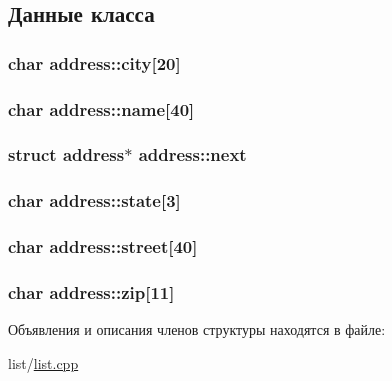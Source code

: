 \subsection{Данные класса}
\hypertarget{structaddress_a4852ddbf08c42594e621cd02e5896aa5}{
\subsubsection[{city}]{\setlength{\rightskip}{0pt plus 5cm}char address\-::city\mbox{[}20\mbox{]}}}\label{structaddress_a4852ddbf08c42594e621cd02e5896aa5}
\hypertarget{structaddress_a2aaf4b88edfd2d1fc111fe66161a0c20}{
\subsubsection[{name}]{\setlength{\rightskip}{0pt plus 5cm}char address\-::name\mbox{[}40\mbox{]}}}\label{structaddress_a2aaf4b88edfd2d1fc111fe66161a0c20}
\hypertarget{structaddress_a7fc6469ede585dbf482921487f2e233c}{
\subsubsection[{next}]{\setlength{\rightskip}{0pt plus 5cm}struct {\bf address}$\ast$ address\-::next}}\label{structaddress_a7fc6469ede585dbf482921487f2e233c}
\hypertarget{structaddress_ac8434820bdc27fbb4fc3ead62b1983ec}{
\subsubsection[{state}]{\setlength{\rightskip}{0pt plus 5cm}char address\-::state\mbox{[}3\mbox{]}}}\label{structaddress_ac8434820bdc27fbb4fc3ead62b1983ec}
\hypertarget{structaddress_a6637fb175db73273b18545c7e862d0e9}{
\subsubsection[{street}]{\setlength{\rightskip}{0pt plus 5cm}char address\-::street\mbox{[}40\mbox{]}}}\label{structaddress_a6637fb175db73273b18545c7e862d0e9}
\hypertarget{structaddress_a4d23b9ff269dec0d61b9398e2a0eb3aa}{
\subsubsection[{zip}]{\setlength{\rightskip}{0pt plus 5cm}char address\-::zip\mbox{[}11\mbox{]}}}\label{structaddress_a4d23b9ff269dec0d61b9398e2a0eb3aa}


Объявления и описания членов структуры находятся в файле\-:\begin{DoxyCompactItemize}
\item 
list/\hyperlink{list_8cpp}{list.\-cpp}\end{DoxyCompactItemize}

